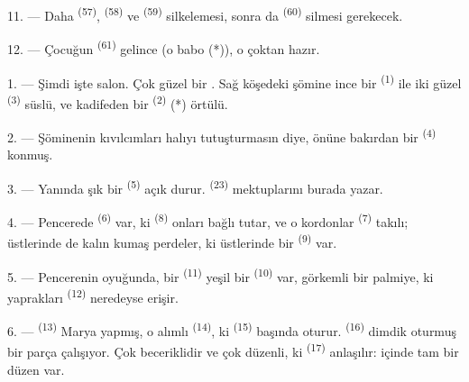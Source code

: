 

11. --- Daha  \textsuperscript{(57)},
 \textsuperscript{(58)} ve 
\textsuperscript{(59)} silkelemesi, sonra da 
\textsuperscript{(60)} silmesi gerekecek.

12. --- Çocuğun  \textsuperscript{(61)} gelince (o babo (*)),
o çoktan hazır.

\VUsaut{5.0mm}
\VUsaut{3.0mm}

1. --- Şimdi işte salon. Çok güzel bir . Sağ köşedeki şömine
ince bir  \textsuperscript{(1)} ile iki güzel 
\textsuperscript{(3)} süslü, ve kadifeden bir 
\textsuperscript{(2)} (*) örtülü.

2. --- Şöminenin kıvılcımları halıyı tutuşturmasın diye, önüne bakırdan bir
 \textsuperscript{(4)} konmuş.

3. --- Yanında şık bir  \textsuperscript{(5)} açık durur.
 \textsuperscript{(23)} mektuplarını burada yazar.

4. --- Pencerede  \textsuperscript{(6)} var, ki
 \textsuperscript{(8)} onları bağlı tutar, ve o kordonlar
 \textsuperscript{(7)} takılı; üstlerinde de kalın kumaş
perdeler, ki üstlerinde bir  \textsuperscript{(9)}
var.

5. --- Pencerenin oyuğunda, bir  \textsuperscript{(11)}
yeşil bir  \textsuperscript{(10)} var, görkemli bir palmiye,
ki yaprakları  \textsuperscript{(12)} neredeyse erişir.

6. ---  \textsuperscript{(13)} Marya yapmış,
o alımlı  \textsuperscript{(14)}, ki 
\textsuperscript{(15)} başında oturur.  \textsuperscript{(16)} dimdik
oturmuş bir parça çalışıyor. Çok beceriklidir ve çok düzenli, ki
 \textsuperscript{(17)} anlaşılır: içinde tam bir
düzen var.

